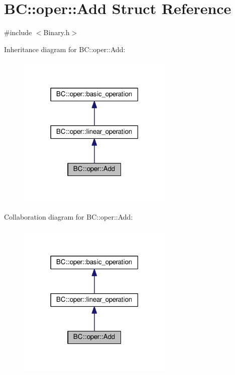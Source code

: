 \hypertarget{structBC_1_1oper_1_1Add}{}\section{BC\+:\+:oper\+:\+:Add Struct Reference}
\label{structBC_1_1oper_1_1Add}


{\ttfamily \#include $<$Binary.\+h$>$}



Inheritance diagram for BC\+:\+:oper\+:\+:Add\+:
\nopagebreak
\begin{figure}[H]
\begin{center}
\leavevmode
\includegraphics[width=210pt]{structBC_1_1oper_1_1Add__inherit__graph}
\end{center}
\end{figure}


Collaboration diagram for BC\+:\+:oper\+:\+:Add\+:
\nopagebreak
\begin{figure}[H]
\begin{center}
\leavevmode
\includegraphics[width=210pt]{structBC_1_1oper_1_1Add__coll__graph}
\end{center}
\end{figure}
